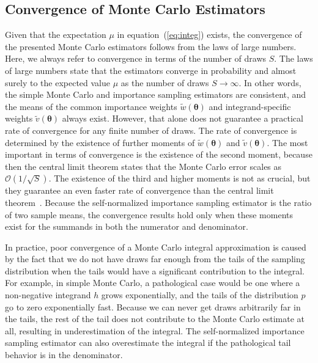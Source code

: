 \documentclass[12pt]{article}
\newcommand{\ome}{v}
\begin{document}
\subsection{Convergence of Monte Carlo Estimators} \label{sec:conv}


Given that the expectation $\mu$ in equation~(\ref{eq:integ}) exists,
the convergence of the presented Monte Carlo estimators
follows from the laws of large numbers.
Here, we always refer to convergence in terms of the number of draws $S$.
The laws of large numbers state that the estimators
converge in probability and almost surely to the expected value $\mu$
as the number of draws $S \rightarrow \infty$.
In other words, the simple Monte Carlo and importance sampling estimators are consistent, and
the means of the common importance weights
$\widetilde{w} (\boldsymbol{\theta})$ and integrand-specific weights $\widetilde{\ome} (\boldsymbol{\theta})$
always exist.
However, that alone does not guarantee
a practical rate of convergence for any finite number of draws.
The rate of convergence is determined by the existence of further moments
of $\widetilde{w} (\boldsymbol{\theta})$ and $\widetilde{\ome} (\boldsymbol{\theta})$.
The most important in terms of convergence is the existence of the second moment, because then
the central limit theorem states that the Monte Carlo error scales as $\mathcal{O} (1/ \sqrt{S})$.
The existence of the third and higher moments is not as crucial,
but they guarantee an even faster rate of convergence than
the central limit theorem~\citep{geweke1989bayesian,tierney1994markov,chen2004normal}.
Because the self-normalized importance sampling estimator is the ratio of two sample means, the
convergence results hold only when these
moments exist for the summands in both the numerator and denominator.


In practice, poor convergence of a Monte Carlo integral approximation is caused by the fact that
we do not have draws far enough from the tails of the sampling distribution when
the tails would have a significant contribution to the integral.
For example, in simple Monte Carlo, a pathological
case would be one where a non-negative integrand $h$ grows exponentially,
and the tails of the distribution $p$ go to zero exponentially fast.
Because we can never get draws arbitrarily far in the tails,
the rest of the tail
does not contribute to the Monte Carlo estimate at all, resulting in
underestimation of the integral.
The self-normalized importance sampling estimator
can also overestimate the integral if the pathological
tail behavior is in the denominator.
\end{document}
